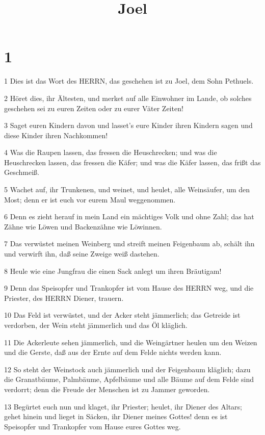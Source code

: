 

\title{Joel}


\chapter{1}

\par 1 Dies ist das Wort des HERRN, das geschehen ist zu Joel, dem Sohn Pethuels.
\par 2 Höret dies, ihr Ältesten, und merket auf alle Einwohner im Lande, ob solches geschehen sei zu euren Zeiten oder zu eurer Väter Zeiten!
\par 3 Saget euren Kindern davon und lasset's eure Kinder ihren Kindern sagen und diese Kinder ihren Nachkommen!
\par 4 Was die Raupen lassen, das fressen die Heuschrecken; und was die Heuschrecken lassen, das fressen die Käfer; und was die Käfer lassen, das frißt das Geschmeiß.
\par 5 Wachet auf, ihr Trunkenen, und weinet, und heulet, alle Weinsäufer, um den Most; denn er ist euch vor eurem Maul weggenommen.
\par 6 Denn es zieht herauf in mein Land ein mächtiges Volk und ohne Zahl; das hat Zähne wie Löwen und Backenzähne wie Löwinnen.
\par 7 Das verwüstet meinen Weinberg und streift meinen Feigenbaum ab, schält ihn und verwirft ihn, daß seine Zweige weiß dastehen.
\par 8 Heule wie eine Jungfrau die einen Sack anlegt um ihren Bräutigam!
\par 9 Denn das Speisopfer und Trankopfer ist vom Hause des HERRN weg, und die Priester, des HERRN Diener, trauern.
\par 10 Das Feld ist verwüstet, und der Acker steht jämmerlich; das Getreide ist verdorben, der Wein steht jämmerlich und das Öl kläglich.
\par 11 Die Ackerleute sehen jämmerlich, und die Weingärtner heulen um den Weizen und die Gerste, daß aus der Ernte auf dem Felde nichts werden kann.
\par 12 So steht der Weinstock auch jämmerlich und der Feigenbaum kläglich; dazu die Granatbäume, Palmbäume, Apfelbäume und alle Bäume auf dem Felde sind verdorrt; denn die Freude der Menschen ist zu Jammer geworden.
\par 13 Begürtet euch nun und klaget, ihr Priester; heulet, ihr Diener des Altars; gehet hinein und lieget in Säcken, ihr Diener meines Gottes! denn es ist Speisopfer und Trankopfer vom Hause eures Gottes weg.

